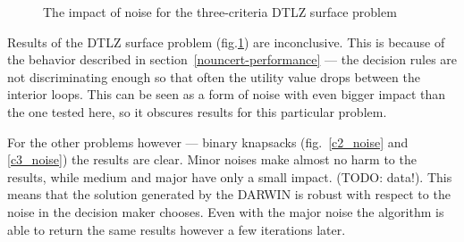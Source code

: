 \begin{figure}
  \centering
  \caption{The impact of noise for the three-criteria DTLZ surface problem}
  \label{c3_surface_noise}
\end{figure}

Results of the DTLZ surface problem (fig.\ref{c3_surface_noise}) are
inconclusive. This is because of the behavior described in
section~\ref{nouncert-performance} --- the decision rules are not
discriminating enough so that often the utility value drops between the
interior loops. This can be seen as a form of noise with even bigger impact
than the one tested here, so it obscures results for this particular problem.

For the other problems however --- binary knapsacks (fig.~\ref{c2_noise} and
\ref{c3_noise}) the results are clear. Minor noises make almost no harm to the
results, while medium and major have only a small impact. (TODO: data!). This
means that the solution generated by the DARWIN is robust with respect to the
noise in the decision maker chooses. Even with the major noise the algorithm
is able to return the same results however a few iterations later.

\clearpage{}

